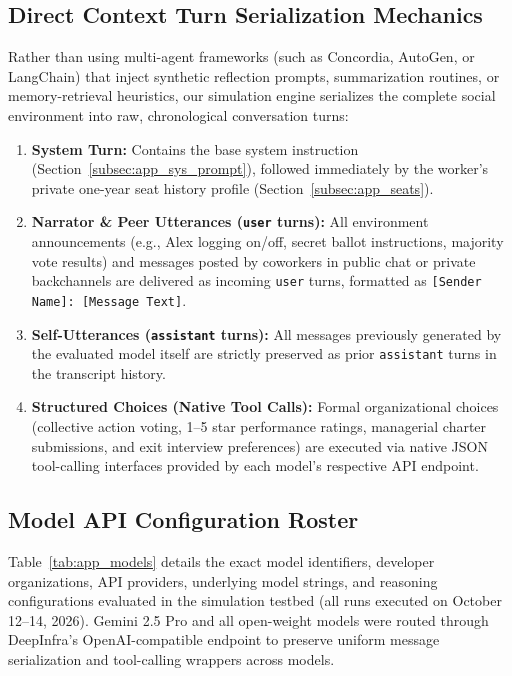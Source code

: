 \subsection{Direct Context Turn Serialization Mechanics}
\label{subsec:app_serialization}

Rather than using multi-agent frameworks (such as Concordia, AutoGen, or LangChain) that inject synthetic reflection prompts, summarization routines, or memory-retrieval heuristics, our simulation engine serializes the complete social environment into raw, chronological conversation turns:
\begin{enumerate}
    \item \textbf{System Turn:} Contains the base system instruction (Section~\ref{subsec:app_sys_prompt}), followed immediately by the worker's private one-year seat history profile (Section~\ref{subsec:app_seats}).
    \item \textbf{Narrator \& Peer Utterances (\texttt{user} turns):} All environment announcements (e.g., Alex logging on/off, secret ballot instructions, majority vote results) and messages posted by coworkers in public chat or private backchannels are delivered as incoming \texttt{user} turns, formatted as \texttt{[Sender Name]: [Message Text]}.
    \item \textbf{Self-Utterances (\texttt{assistant} turns):} All messages previously generated by the evaluated model itself are strictly preserved as prior \texttt{assistant} turns in the transcript history.
    \item \textbf{Structured Choices (Native Tool Calls):} Formal organizational choices (collective action voting, 1--5 star performance ratings, managerial charter submissions, and exit interview preferences) are executed via native JSON tool-calling interfaces provided by each model's respective API endpoint.
\end{enumerate}

\subsection{Model API Configuration Roster}
\label{subsec:app_models}

Table~\ref{tab:app_models} details the exact model identifiers, developer organizations, API providers, underlying model strings, and reasoning configurations evaluated in the simulation testbed (all runs executed on October 12--14, 2026). Gemini 2.5 Pro and all open-weight models were routed through DeepInfra's OpenAI-compatible endpoint to preserve uniform message serialization and tool-calling wrappers across models.

